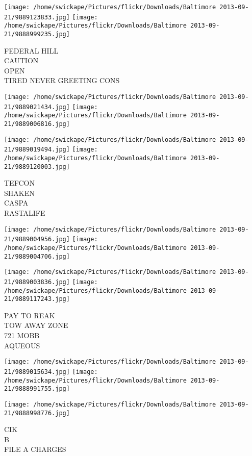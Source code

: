 \documentclass[10pt,letterpaper]{article}
\begin{document}
\texttt{[image: /home/swickape/Pictures/flickr/Downloads/Baltimore 2013-09-21/9889123833.jpg]}
\texttt{[image: /home/swickape/Pictures/flickr/Downloads/Baltimore 2013-09-21/9888999235.jpg]}

FEDERAL HILL\\
CAUTION\\
OPEN\\
TIRED NEVER GREETING CONS\\
\pagebreak

\texttt{[image: /home/swickape/Pictures/flickr/Downloads/Baltimore 2013-09-21/9889021434.jpg]}
\texttt{[image: /home/swickape/Pictures/flickr/Downloads/Baltimore 2013-09-21/9889006816.jpg]}

\texttt{[image: /home/swickape/Pictures/flickr/Downloads/Baltimore 2013-09-21/9889019494.jpg]}
\texttt{[image: /home/swickape/Pictures/flickr/Downloads/Baltimore 2013-09-21/9889120003.jpg]}

TEFCON\\
SHAKEN\\
CASPA\\
RASTALIFE\\
\pagebreak

\texttt{[image: /home/swickape/Pictures/flickr/Downloads/Baltimore 2013-09-21/9889004956.jpg]}
\texttt{[image: /home/swickape/Pictures/flickr/Downloads/Baltimore 2013-09-21/9889004706.jpg]}

\texttt{[image: /home/swickape/Pictures/flickr/Downloads/Baltimore 2013-09-21/9889003836.jpg]}
\texttt{[image: /home/swickape/Pictures/flickr/Downloads/Baltimore 2013-09-21/9889117243.jpg]}

PAY TO REAK\\
TOW AWAY ZONE\\
721 MOBB\\
AQUEOUS\\
\pagebreak

\texttt{[image: /home/swickape/Pictures/flickr/Downloads/Baltimore 2013-09-21/9889015634.jpg]}
\texttt{[image: /home/swickape/Pictures/flickr/Downloads/Baltimore 2013-09-21/9888991755.jpg]}

\vspace{0.25in}
\texttt{[image: /home/swickape/Pictures/flickr/Downloads/Baltimore 2013-09-21/9888998776.jpg]}

CIK\\
B\\
FILE A CHARGES\\
\pagebreak
\end{document}
